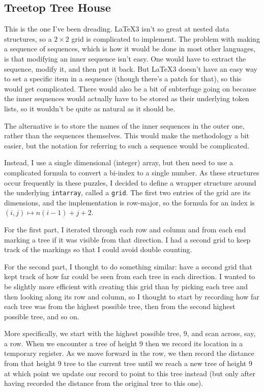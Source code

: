 \documentclass{article}
\begin{document}
\subsection{Treetop Tree House}

This is the one I've been dreading.
\LaTeX3 isn't so great at nested data structures, so a \(2 \times 2\) grid is complicated to implement.
The problem with making a sequence of sequences, which is how it would be done in most other languages, is that modifying an inner sequence isn't easy.
One would have to extract the sequence, modify it, and then put it back.
But \LaTeX3 doesn't have an easy way to set a specific item in a sequence (though there's a patch for that), so this would get complicated.
There would also be a bit of subterfuge going on because the inner sequences would actually have to be stored as their underlying token lists, so it wouldn't be quite as natural as it should be.

The alternative is to store the names of the inner sequences in the outer one, rather than the sequences themselves.
This would make the methodology a bit easier, but the notation for referring to such a sequence would be complicated.

Instead, I use a single dimensional (integer) array, but then need to use a complicated formula to convert a bi-index to a single number.
As these structures occur frequently in these puzzles, I decided to define a wrapper structure around the underlying \Verb!intarray!, called a \Verb!grid!.
The first two entries of the grid are its dimensions, and the implementation is row-major, so the formula for an index is \((i,j) \mapsto n(i-1) + j + 2\).

For the first part, I iterated through each row and column and from each end marking a tree if it was visible from that direction.
I had a second grid to keep track of the markings so that I could avoid double counting.

For the second part, I thought to do something similar: have a second grid that kept track of how far could be seen from each tree in each direction.
I wanted to be slightly more efficient with creating this grid than by picking each tree and then looking along its row and column, so I thought to start by recording how far each tree was from the highest possible tree, then from the second highest possible tree, and so on.

More specifically, we start with the highest possible tree, \(9\), and scan across, say, a row.
When we encounter a tree of height \(9\) then we record its location in a temporary register.
As we move forward in the row, we then record the distance from that height \(9\) tree to the current tree until we reach a new tree of height \(9\) at which point we update our record to point to this tree instead (but only after having recorded the distance from the original tree to this one).
\end{document}
